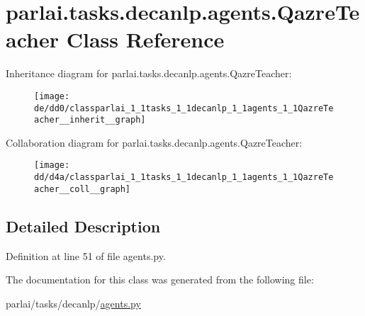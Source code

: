 \hypertarget{classparlai_1_1tasks_1_1decanlp_1_1agents_1_1QazreTeacher}{}\section{parlai.\+tasks.\+decanlp.\+agents.\+Qazre\+Teacher Class Reference}
\label{classparlai_1_1tasks_1_1decanlp_1_1agents_1_1QazreTeacher}


Inheritance diagram for parlai.\+tasks.\+decanlp.\+agents.\+Qazre\+Teacher\+:
\nopagebreak
\begin{figure}[H]
\begin{center}
\leavevmode
\texttt{[image: de/dd0/classparlai\_1\_1tasks\_1\_1decanlp\_1\_1agents\_1\_1QazreTeacher\_\_inherit\_\_graph]}
\end{center}
\end{figure}


Collaboration diagram for parlai.\+tasks.\+decanlp.\+agents.\+Qazre\+Teacher\+:
\nopagebreak
\begin{figure}[H]
\begin{center}
\leavevmode
\texttt{[image: dd/d4a/classparlai\_1\_1tasks\_1\_1decanlp\_1\_1agents\_1\_1QazreTeacher\_\_coll\_\_graph]}
\end{center}
\end{figure}


\subsection{Detailed Description}


Definition at line 51 of file agents.\+py.



The documentation for this class was generated from the following file\+:\begin{DoxyCompactItemize}
\item 
parlai/tasks/decanlp/\hyperlink{parlai_2tasks_2decanlp_2agents_8py}{agents.\+py}\end{DoxyCompactItemize}
